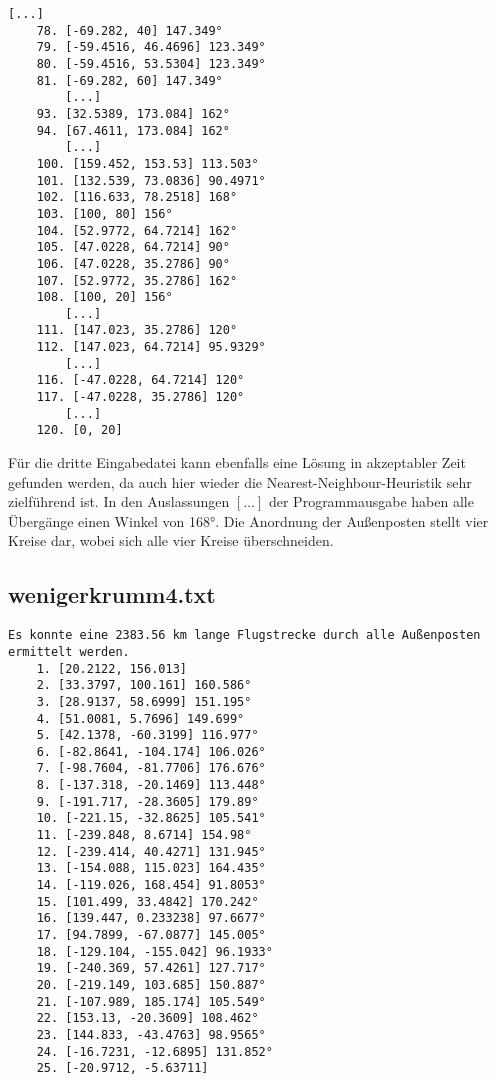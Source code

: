 \documentclass[a4paper,10pt,ngerman]{scrartcl}
\begin{document}
\begin{lstlisting}[frame=single, title=Programmausgabe wenigerkrumm3.txt, breaklines=true,label={lst:lstlisting8}]
        [...]
    78. [-69.282, 40] 147.349°
    79. [-59.4516, 46.4696] 123.349°
    80. [-59.4516, 53.5304] 123.349°
    81. [-69.282, 60] 147.349°
        [...]
    93. [32.5389, 173.084] 162°
    94. [67.4611, 173.084] 162°
        [...]
    100. [159.452, 153.53] 113.503°
    101. [132.539, 73.0836] 90.4971°
    102. [116.633, 78.2518] 168°
    103. [100, 80] 156°
    104. [52.9772, 64.7214] 162°
    105. [47.0228, 64.7214] 90°
    106. [47.0228, 35.2786] 90°
    107. [52.9772, 35.2786] 162°
    108. [100, 20] 156°
        [...]
    111. [147.023, 35.2786] 120°
    112. [147.023, 64.7214] 95.9329°
        [...]
    116. [-47.0228, 64.7214] 120°
    117. [-47.0228, 35.2786] 120°
        [...]
    120. [0, 20]
    \end{lstlisting}

    Für die dritte Eingabedatei kann ebenfalls eine Lösung in akzeptabler Zeit gefunden werden,
    da auch hier wieder die Nearest-Neighbour-Heuristik sehr zielführend ist.
    In den Auslassungen $[\dots]$ der Programmausgabe haben alle Übergänge einen Winkel von 168°.
    Die Anordnung der Außenposten stellt vier Kreise dar, wobei sich alle vier Kreise überschneiden.

    \subsection{wenigerkrumm4.txt}\label{subsec:wenigerkrumm4.txt}

    \begin{lstlisting}[frame=single, title=Programmausgabe wenigerkrumm4.txt, breaklines=true,label={lst:lstlisting9}]
    Es konnte eine 2383.56 km lange Flugstrecke durch alle Außenposten ermittelt werden.
    1. [20.2122, 156.013]
    2. [33.3797, 100.161] 160.586°
    3. [28.9137, 58.6999] 151.195°
    4. [51.0081, 5.7696] 149.699°
    5. [42.1378, -60.3199] 116.977°
    6. [-82.8641, -104.174] 106.026°
    7. [-98.7604, -81.7706] 176.676°
    8. [-137.318, -20.1469] 113.448°
    9. [-191.717, -28.3605] 179.89°
    10. [-221.15, -32.8625] 105.541°
    11. [-239.848, 8.6714] 154.98°
    12. [-239.414, 40.4271] 131.945°
    13. [-154.088, 115.023] 164.435°
    14. [-119.026, 168.454] 91.8053°
    15. [101.499, 33.4842] 170.242°
    16. [139.447, 0.233238] 97.6677°
    17. [94.7899, -67.0877] 145.005°
    18. [-129.104, -155.042] 96.1933°
    19. [-240.369, 57.4261] 127.717°
    20. [-219.149, 103.685] 150.887°
    21. [-107.989, 185.174] 105.549°
    22. [153.13, -20.3609] 108.462°
    23. [144.833, -43.4763] 98.9565°
    24. [-16.7231, -12.6895] 131.852°
    25. [-20.9712, -5.63711]
    \end{lstlisting}
\end{document}
